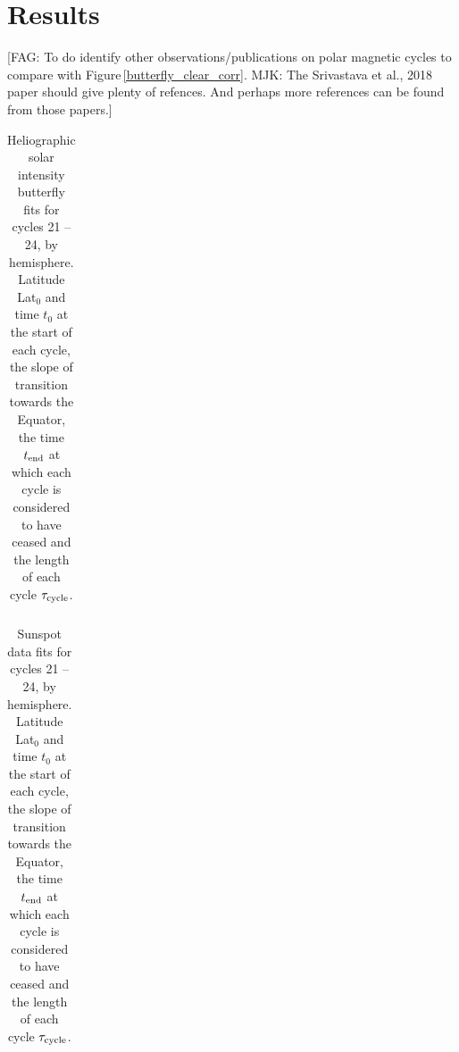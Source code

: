 \documentclass{aa}
\newcommand{\fag}[1]{\textcolor{midpurple}{[FAG: #1]}} %
\begin{document}




\section{Results}\label{sect:results}
\fag{To do identify other observations/publications on polar magnetic cycles to compare with
Figure\,\ref{butterfly_clear_corr}. MJK: The Srivastava et al., 2018 paper should give plenty of refences. And perhaps more references can be found from those papers.}\\

\begin{table}
\caption{\label{tab:cycles}
Heliographic solar intensity butterfly fits for cycles 21 -- 24, by hemisphere.
Latitude Lat$_0$ and time $t_0$ at the start of each cycle, the slope of transition
towards the Equator, the time $t_{\rm end}$ at which each cycle is considered to have
ceased and the length of each cycle $\tau_{\rm cycle}$.
}
\begin{tabular}{l|ccccr}
\hline\hline

\hline
\end{tabular}
\end{table}

\begin{table}
\caption{\label{tab:cycles_sunspot}
Sunspot data fits for cycles 21 -- 24, by hemisphere.
Latitude Lat$_0$ and time $t_0$ at the start of each cycle, the slope of transition
towards the Equator, the time $t_{\rm end}$ at which each cycle is considered to have
ceased and the length of each cycle $\tau_{\rm cycle}$.
}
\begin{tabular}{l|ccccr}
\hline\hline

\hline
\end{tabular}
\end{table}
\end{document}

